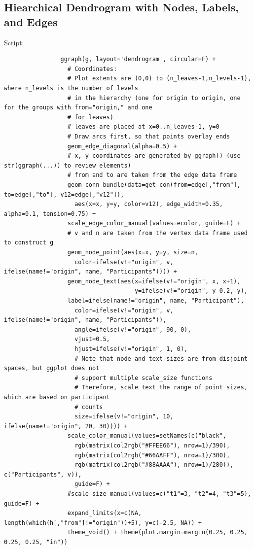 \documentclass[10pt, letterpaper]{article}
\begin{document}
\begin{spacing}{1.0}
\subsection{Hiearchical Dendrogram with Nodes, Labels, and Edges}

Script:
\small
\begin{verbatim}
                ggraph(g, layout='dendrogram', circular=F) +
                  # Coordinates:
                  # Plot extents are (0,0) to (n_leaves-1,n_levels-1), where n_levels is the number of levels
                  # in the hierarchy (one for origin to origin, one for the groups with from="origin," and one
                  # for leaves)
                  # leaves are placed at x=0..n_leaves-1, y=0
                  # Draw arcs first, so that points overlay ends
                  geom_edge_diagonal(alpha=0.5) +
                  # x, y coordinates are generated by ggraph() (use str(ggraph(...)) to review elements)
                  # from and to are taken from the edge data frame
                  geom_conn_bundle(data=get_con(from=edge[,"from"], to=edge[,"to"], v12=edge[,"v12"]),
                    aes(x=x, y=y, color=v12), edge_width=0.35, alpha=0.1, tension=0.75) +
                  scale_edge_color_manual(values=ecolor, guide=F) +
                  # v and n are taken from the vertex data frame used to construct g
                  geom_node_point(aes(x=x, y=y, size=n,
                    color=ifelse(v!="origin", v, ifelse(name!="origin", name, "Participants")))) +
                  geom_node_text(aes(x=ifelse(v!="origin", x, x+1),
                                     y=ifelse(v!="origin", y-0.2, y),
                  label=ifelse(name!="origin", name, "Participant"),
                    color=ifelse(v!="origin", v, ifelse(name!="origin", name, "Participants")),
                    angle=ifelse(v!="origin", 90, 0),
                    vjust=0.5,
                    hjust=ifelse(v!="origin", 1, 0),
                    # Note that node and text sizes are from disjoint spaces, but ggplot does not
                    # support multiple scale_size functions
                    # Therefore, scale text the range of point sizes, which are based on participant
                    # counts
                    size=ifelse(v!="origin", 10, ifelse(name!="origin", 20, 30)))) +
                  scale_color_manual(values=setNames(c("black",
                    rgb(matrix(col2rgb("#FFEE66"), nrow=1)/390),
                    rgb(matrix(col2rgb("#66AAFF"), nrow=1)/300),
                    rgb(matrix(col2rgb("#88AAAA"), nrow=1)/280)), c("Participants", v)),
                    guide=F) +
                  #scale_size_manual(values=c("t1"=3, "t2"=4, "t3"=5), guide=F) +
                  expand_limits(x=c(NA, length(which(h[,"from"]!="origin"))+5), y=c(-2.5, NA)) +
                  theme_void() + theme(plot.margin=margin(0.25, 0.25, 0.25, 0.25, "in"))
\end{verbatim}
\normalsize


\end{spacing}
\end{document}
